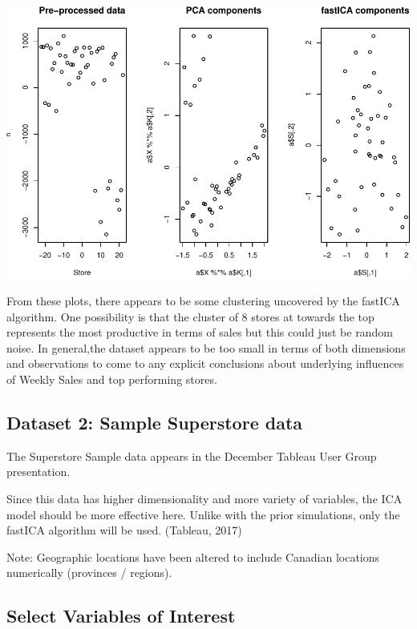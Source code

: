 \documentclass[12pt,twoside]{amherstthesis}
\begin{document}
  \begin{center}\includegraphics{ICAStatsComps_files/figure-latex/unnamed-chunk-25-1} \end{center}
  
  From these plots, there appears to be some clustering uncovered by the
  fastICA algorithm. One possibility is that the cluster of 8 stores at
  towards the top represents the most productive in terms of sales but
  this could just be random noise. In general,the dataset appears to be
  too small in terms of both dimensions and observations to come to any
  explicit conclusions about underlying influences of Weekly Sales and top
  performing stores.
  
  \subsection{Dataset 2: Sample Superstore
  data}\label{dataset-2-sample-superstore-data}
  
  The Superstore Sample data appears in the December Tableau User Group
  presentation.
  
  Since this data has higher dimensionality and more variety of variables,
  the ICA model should be more effective here. Unlike with the prior
  simulations, only the fastICA algorithm will be used. (Tableau, 2017)
  
  Note: Geographic locations have been altered to include Canadian
  locations numerically (provinces / regions). \newline
  
  \subsection{Select Variables of
  Interest}\label{select-variables-of-interest}
  
\end{document}
